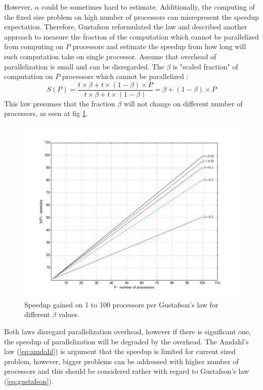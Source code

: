 However, $\alpha$ could be sometimes hard to estimate. Additionally, the computing of the fixed size problem on high number of processors can misrepresent the speedup expectation. Therefore, Gustafson reformulated the law and described another approach to measure the fraction of the computation which cannot be parallelized from computing on $P$ processors and estimate the speedup from how long will such computation take on single processor. Assume that overhead of parallelization is small and can be disregarded. The $\beta$ is "scaled fraction" of computation on $P$ processors which cannot be parallelized \cite{Gustafson1988}:
\begin{equation} \label{eq:gustafson}
S(P) = \frac{t \times \beta + t\times(1-\beta)\times P}{t\times\beta+t\times(1-\beta)} = \beta + (1-\beta)\times P 
\end{equation}
This law presumes that the fraction $\beta$ will not change on different number of processors, as seen at fig \ref{fig:gustafson}.
\begin{figure}[ht]
    \centering
    \includegraphics[width=1\textwidth]{chapter2/Gustafson.png}
    \caption{Speedup gained on 1 to 100 processors per Gustafson's law for different $\beta$ values.}
    \label{fig:gustafson}
\end{figure}

Both laws disregard parallelization overhead, however if there is significant one, the speedup of parallelization will be degraded by the overhead. The Amdahl's law (\ref{eq:amdahl}) is argument that the speedup is limited for current sized problem, however, bigger problems can be addressed with higher number of processors and this should be considered rather with regard to Gustafson's law (\ref{eq:gustafson}).

